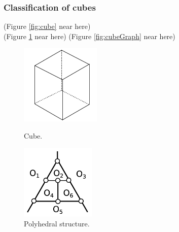 \documentclass[suppldata, dvipdfmx]{interact}
\theoremstyle{plain}%
\theoremstyle{definition}
\theoremstyle{remark}
\theoremstyle{problemstyle}
\begin{document}
\subsubsection{Classification of cubes}

\noindent(Figure \ref{fig:cube} near here)\\
(Figure \ref{fig:cubePolyhedralStructure} near here)
\noindent(Figure \ref{fig:cubeGraph}
 near here)

\begin{figure}[h!tbp]
  \begin{minipage}[t]{0.66\textwidth}
 \centering
 \includegraphics[width=1.5in,
 keepaspectratio]{./img/HexahedraWithSphericalFaces/cube.jpg}
 \caption{Cube.}
 \label{fig:cube}
  \end{minipage}
 \hspace*{\fill}
  \begin{minipage}[t]{0.33\textwidth}
   \centering
   \includegraphics[width=1.4in, keepaspectratio]{./img/HexahedraWithSphericalFaces/cube/cubeFaces.jpg}
   \caption{Polyhedral structure.}
   \label{fig:cubePolyhedralStructure}
  \end{minipage}
\end{figure}
\end{document}
